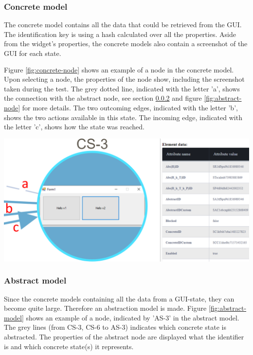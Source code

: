 \subsubsection{Concrete model}
The concrete model contains all the data that could be retrieved from the GUI. The identification key is using a hash calculated over all the properties. Aside from the widget's properties, the concrete models also contain a screenshot of the GUI for each state.

Figure \ref{fig:concrete-node} shows an example of a node in the concrete model. Upon selecting a node, the properties of the node show, including the screenshot taken during the test. The grey dotted line, indicated with the letter 'a', shows the connection with the abstract node, see section \ref{abstract-model} and figure \ref{fig:abstract-node} for more details. The two outcoming edges, indicated with the letter 'b', shows the two actions available in this state. The incoming edge, indicated with the letter 'c', shows how the state was reached. 

\bigskip
\begingroup
\captionsetup{type=figure}
\includegraphics[scale=0.5]{document/pics/concrete-model.png}
\label{fig:concrete-node}
\endgroup

\subsubsection{Abstract model} \label{abstract-model}
Since the concrete models containing all the data from a GUI-state, they can become quite large.  Therefore an abstraction model is made. Figure \ref{fig:abstract-model} shows an example of a node, indicated by 'AS-3'  in the abstract model. The grey lines (from CS-3, CS-6 to AS-3) indicates which concrete state is abstracted. The properties of the abstract node are displayed what the identifier is and which concrete state(s) it represents.

